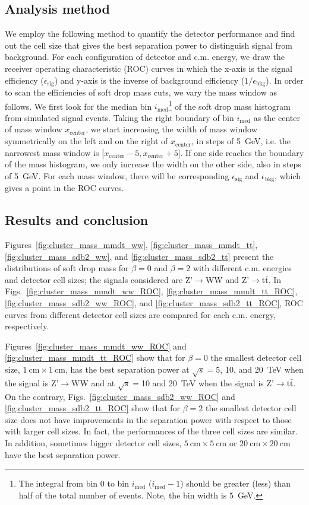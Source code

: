 \subsection{Analysis method}
We employ the following method to quantify the detector performance and 
find out the cell size that gives the best separation power to distinguish 
signal from background. For each configuration of detector and c.m. energy, 
we draw the receiver operating characteristic (ROC) curves in which the x-axis
 is the signal efficiency ($\epsilon_\mathrm{sig}$) and y-axis is the inverse 
of background efficiency ($1/\epsilon_\mathrm{bkg}$). 
In order to scan the efficiencies of soft drop mass cuts, we vary the mass 
window as follows. We first look for the median bin 
$i_\mathrm{med}$\footnote{The integral from bin 0 to bin $i_\mathrm{med}$ 
($i_\mathrm{med}-1$) should be greater (less) than half 
of the total number of events. Note, the bin width is 5~GeV.} of the soft 
drop mass histogram from simulated signal events. Taking the right boundary
 of bin $i_\mathrm{med}$ as the center of mass window 
$x_\mathrm{center}$, we start increasing the width of mass window symmetrically
 on the left and on the right of $x_\mathrm{center}$, in steps of 5~GeV, 
i.e. the narrowest mass window is 
[$x_\mathrm{center}-5,x_\mathrm{center}+5$]. If one side reaches the boundary 
of the mass histogram, we only increase the width on the other side, also in 
steps of 5~GeV. For each mass window, there will be corresponding 
$\epsilon_\mathrm{sig}$ and $\epsilon_\mathrm{bkg}$, which gives a point in 
the ROC curves.

\subsection{Results and conclusion}
Figures~\ref{fig:cluster_mass_mmdt_ww}, \ref{fig:cluster_mass_mmdt_tt},
 \ref{fig:cluster_mass_sdb2_ww}, and \ref{fig:cluster_mass_sdb2_tt} 
present the distributions of soft drop mass for $\beta=0$ and $\beta=2$ with 
different c.m. energies and detector cell sizes; the signals considered are 
Z'$\rightarrow$WW and Z'$\rightarrow$t$\bar{\mathrm{t}}$. 
In Figs.~\ref{fig:cluster_mass_mmdt_ww_ROC}, \ref{fig:cluster_mass_mmdt_tt_ROC}, \ref{fig:cluster_mass_sdb2_ww_ROC}, and \ref{fig:cluster_mass_sdb2_tt_ROC}, 
ROC curves from different detector cell sizes are compared for each 
c.m. energy, respectively. 

Figures~\ref{fig:cluster_mass_mmdt_ww_ROC} and 
\ref{fig:cluster_mass_mmdt_tt_ROC} show that for $\beta=0$ the 
smallest detector cell size, 
 $1~\mathrm{cm}\times1~\mathrm{cm}$, has the best separation power at 
$\sqrt{s}=$5, 10, and 20~TeV when the signal is Z'$\rightarrow$WW and 
at  $\sqrt{s}=$10 and 20~TeV when the signal is Z'$\rightarrow$t$\bar{\mathrm{t}}$.
On the contrary, Figs.~\ref{fig:cluster_mass_sdb2_ww_ROC} and \ref{fig:cluster_mass_sdb2_tt_ROC} show that for $\beta=2$ the smallest detector cell size 
does not have improvements in the separation power with respect to those with 
larger cell sizes. In fact, the performances of the three cell sizes are 
similar. In addition, sometimes bigger detector cell sizes, 
$5~\mathrm{cm}\times5~\mathrm{cm}$ or $20~\mathrm{cm}\times20~\mathrm{cm}$
 have the best separation power. 

